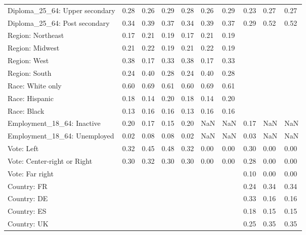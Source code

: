 \begin{tabular}[t]{llllllllll}
Diploma\_25\_64: Upper secondary & 0.28 & 0.26 & 0.29 & 0.28 & 0.26 & 0.29 & 0.23 & 0.27 & 0.27\\
Diploma\_25\_64: Post secondary & 0.34 & 0.39 & 0.37 & 0.34 & 0.39 & 0.37 & 0.29 & 0.52 & 0.52\\
\addlinespace
Region: Northeast & 0.17 & 0.21 & 0.19 & 0.17 & 0.21 & 0.19 &  &  & \\
Region: Midwest & 0.21 & 0.22 & 0.19 & 0.21 & 0.22 & 0.19 &  &  & \\
Region: West & 0.38 & 0.17 & 0.33 & 0.38 & 0.17 & 0.33 &  &  & \\
Region: South & 0.24 & 0.40 & 0.28 & 0.24 & 0.40 & 0.28 &  &  & \\
\addlinespace
Race: White only & 0.60 & 0.69 & 0.61 & 0.60 & 0.69 & 0.61 &  &  & \\
Race: Hispanic & 0.18 & 0.14 & 0.20 & 0.18 & 0.14 & 0.20 &  &  & \\
Race: Black & 0.13 & 0.16 & 0.16 & 0.13 & 0.16 & 0.16 &  &  & \\
\addlinespace
Employment\_18\_64: Inactive & 0.20 & 0.17 & 0.15 & 0.20 & NaN & NaN & 0.17 & NaN & NaN\\
Employment\_18\_64: Unemployed & 0.02 & 0.08 & 0.08 & 0.02 & NaN & NaN & 0.03 & NaN & NaN\\
\addlinespace
Vote: Left & 0.32 & 0.45 & 0.48 & 0.32 & 0.00 & 0.00 & 0.30 & 0.00 & 0.00\\
Vote: Center-right or Right & 0.30 & 0.32 & 0.30 & 0.30 & 0.00 & 0.00 & 0.28 & 0.00 & 0.00\\
Vote: Far right &  &  &  &  &  &  & 0.10 & 0.00 & 0.00\\
\addlinespace
Country: FR &  &  &  &  &  &  & 0.24 & 0.34 & 0.34\\
Country: DE &  &  &  &  &  &  & 0.33 & 0.16 & 0.16\\
Country: ES &  &  &  &  &  &  & 0.18 & 0.15 & 0.15\\
Country: UK &  &  &  &  &  &  & 0.25 & 0.35 & 0.35\\
\bottomrule
\end{tabular}